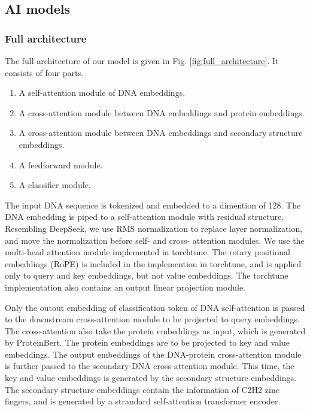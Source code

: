 \documentclass{article}
\begin{document}
\subsection{AI models}

\subsubsection{Full architecture}

The full architecture of our model is given in Fig. \ref{fig:full_architecture}. It consists of four parts.
\begin{enumerate}
    \item A self-attention module of DNA embeddings.
    \item A cross-attention module between DNA embeddings and protein embeddings.
    \item A cross-attention module between DNA embeddings and secondary structure embeddings.
    \item A feedforward module.
    \item A classifier module.
\end{enumerate}
The input DNA sequence is tokenized and embedded to a dimention of 128. The DNA embedding is piped to a self-attention module with residual structure. Resembling DeepSeek\cite{deepseekai2024deepseekv2strongeconomicalefficient}, we use RMS normalization to replace layer normalization, and move the normalization before self- and cross- attention modules. We use the multi-head attention module implemented in torchtune. The rotary positional embeddings (RoPE) is included in the implemention in torchtune\cite{SU2024127063}, and is applied only to query and key embeddings, but not value embeddings. The torchtune implementation also contains an output linear projection module.

Only the outout embedding of classification token of DNA self-attention is passed to the downstream cross-attention module to be projected to query embeddings. The cross-attention also take the protein embeddings as input, which is generated by ProteinBert. The protein embeddings are to be projected to key and value embeddings. The output embeddings of the DNA-protein cross-attention module is further passed to the secondary-DNA cross-attention module. This time, the key and value embeddings is generated by the secondary structure embeddings. The secondary structure embeddings contain the information of C2H2 zinc fingers, and is generated by a strandard self-attention transformer encoder.
\end{document}
